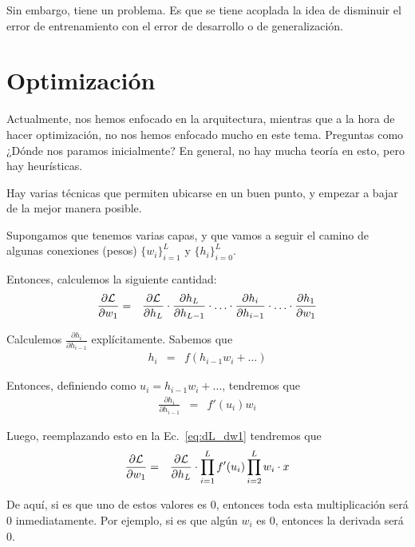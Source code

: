 Sin embargo, tiene un problema. Es que se tiene acoplada la idea de disminuir el error de entrenamiento con el error de desarrollo o de generalización. 

\section{Optimización}

Actualmente, nos hemos enfocado en la arquitectura, mientras que a la hora de hacer optimización, no nos hemos enfocado mucho en este tema. Preguntas como ¿Dónde nos paramos inicialmente? En general, no hay mucha teoría en esto, pero hay heurísticas.

Hay varias técnicas que permiten ubicarse en un buen punto, y empezar a bajar de la mejor manera posible.

Supongamos que tenemos varias capas, y que vamos a seguir el camino de algunas conexiones (pesos) $\{w_i\}_{i=1}^{L}$ y $\{h_i\}_{i=0}^{L}$.

Entonces, calculemos la siguiente cantidad:
\begin{eqnarray}\label{eq:dL_dw1}
\frac{\partial \mathcal{L}}{\partial w_1}
&=& \frac{\partial \mathcal{L}}{\partial h_L}
\cdot \frac{\partial h_L}{\partial h_{L-1}}
\cdot \ldots \cdot \frac{\partial h_i}{\partial h_{i-1}}
\cdot \ldots \cdot \frac{\partial h_1}{\partial w_1}
\end{eqnarray}

Calculemos $\frac{\partial h_i}{\partial h_{i-1}}$ explícitamente. Sabemos que
\begin{eqnarray*}
    h_i &=& f(h_{i-1} w_i + \ldots) 
\end{eqnarray*}

Entonces, definiendo como $u_i = h_{i-1} w_i + \ldots$, tendremos que
\begin{eqnarray*}
    \frac{\partial h_i}{\partial h_{i-1}} 
    &=& f'(u_i) w_i
\end{eqnarray*}

Luego, reemplazando esto en la Ec.~\eqref{eq:dL_dw1} tendremos que
\begin{eqnarray}
\frac{\partial \mathcal{L}}{\partial w_1}
&=& \frac{\partial \mathcal{L}}{\partial h_L}
\cdot \prod_{i=1}^{L} f'(u_i) \prod_{i=2}^{L} w_i
\cdot x
\end{eqnarray}

De aquí, si es que uno de estos valores es 0, entonces toda esta multiplicación será $0$ inmediatamente. Por ejemplo, si es que algún $w_i$ es $0$, entonces la derivada será 0.

